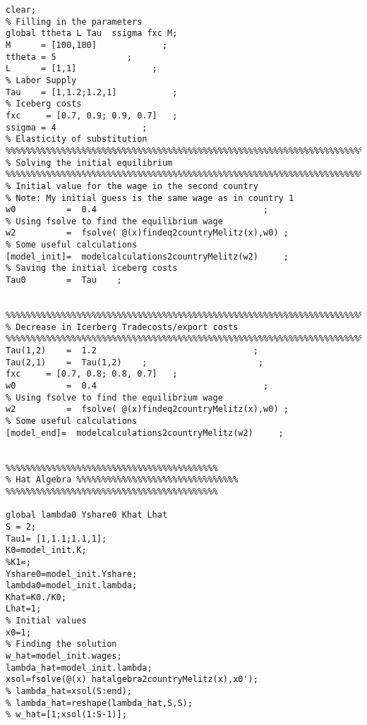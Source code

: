 \begin{enumerate}
\begin{verbatim}
clear;
% Filling in the parameters
global ttheta L Tau  ssigma fxc M;
M      = [100,100]             ;
ttheta = 5              ;
L      = [1,1]               ;                                          % Labor Supply
Tau    = [1,1.2;1.2,1]           ;                                      % Iceberg costs
fxc     = [0.7, 0.9; 0.9, 0.7]   ;                                          
ssigma = 4                 ;                                            % Elasticity of substitution
%%%%%%%%%%%%%%%%%%%%%%%%%%%%%%%%%%%%%%%%%%%%%%%%%%%%%%%%%%%%%%%%%%%%%%%%%%%%%%%%%%%%%%%%%%%%%%%%%%%%%%%%%%%%%%%%%%%%%%%%%%%%%%%%%%%%%%%%%%%%%%%%%%%%
% Solving the initial equilibrium
%%%%%%%%%%%%%%%%%%%%%%%%%%%%%%%%%%%%%%%%%%%%%%%%%%%%%%%%%%%%%%%%%%%%%%%%%%%%%%%%%%%%%%%%%%%%%%%%%%%%%%%%%%%%%%%%%%%%%%%%%%%%%%%%%%%%%%%%%%%%%%%%%%%%
% Initial value for the wage in the second country
% Note: My initial guess is the same wage as in country 1
w0          =  0.4                                 ;           
% Using fsolve to find the equilibrium wage 
w2          =  fsolve( @(x)findeq2countryMelitz(x),w0) ;
% Some useful calculations 
[model_init]=  modelcalculations2countryMelitz(w2)     ;
% Saving the initial iceberg costs
Tau0        =  Tau    ;


%%%%%%%%%%%%%%%%%%%%%%%%%%%%%%%%%%%%%%%%%%%%%%%%%%%%%%%%%%%%%%%%%%%%%%%%%%%%%%%%%%%%%%%%%%%%%%%%%%%%%%%%%%%%%%%%%%%%%%%%%%%%%%%%%%%%%%%%%%%%%%%%%%%%
% Decrease in Icerberg Tradecosts/export costs
%%%%%%%%%%%%%%%%%%%%%%%%%%%%%%%%%%%%%%%%%%%%%%%%%%%%%%%%%%%%%%%%%%%%%%%%%%%%%%%%%%%%%%%%%%%%%%%%%%%%%%%%%%%%%%%%%%%%%%%%%%%%%%%%%%%%%%%%%%%%%%%%%%%%
Tau(1,2)    =  1.2                               ;
Tau(2,1)    =  Tau(1,2)    ;                      ;
fxc     = [0.7, 0.8; 0.8, 0.7]   ;  
w0          =  0.4                                 ;           
% Using fsolve to find the equilibrium wage 
w2          =  fsolve( @(x)findeq2countryMelitz(x),w0) ;
% Some useful calculations 
[model_end]=  modelcalculations2countryMelitz(w2)     ;


%%%%%%%%%%%%%%%%%%%%%%%%%%%%%%%%%%%%%%%%%%
% Hat Algebra %%%%%%%%%%%%%%%%%%%%%%%%%%%%%%%%
%%%%%%%%%%%%%%%%%%%%%%%%%%%%%%%%%%%%%%%%%%

global lambda0 Yshare0 Khat Lhat
S = 2;
Tau1= [1,1.1;1.1,1];
K0=model_init.K;
%K1=;
Yshare0=model_init.Yshare;
lambda0=model_init.lambda;
Khat=K0./K0;
Lhat=1;
% Initial values
x0=1;
% Finding the solution
w_hat=model_init.wages;
lambda_hat=model_init.lambda;
xsol=fsolve(@(x) hatalgebra2countryMelitz(x),x0');
% lambda_hat=xsol(S:end);
% lambda_hat=reshape(lambda_hat,S,S);
% w_hat=[1;xsol(1:S-1)];
  \end{verbatim}
\end{enumerate}
